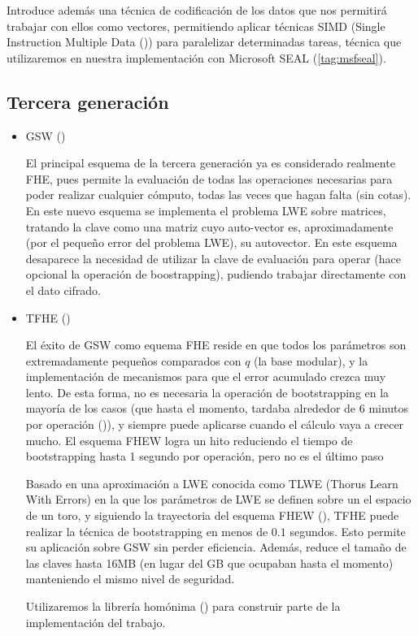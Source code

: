 \begin{itemize}
    Introduce además una técnica de codificación de los datos que nos permitirá trabajar con ellos como vectores, permitiendo aplicar técnicas SIMD (Single Instruction Multiple Data (\cite{wikipedia_contributors._simd_2017})) para paralelizar determinadas tareas, técnica que utilizaremos en nuestra implementación con Microsoft SEAL (\ref{tag:msfseal}).

\end{itemize}

\subsection{Tercera generación}

\begin{itemize}

  \item GSW (\cite{gentry_homomorphic_2013})

  El principal esquema de la tercera generación ya es considerado realmente FHE, pues permite la evaluación de todas las operaciones necesarias para poder realizar cualquier cómputo, todas las veces que hagan falta (sin cotas). En este nuevo esquema se implementa el problema LWE sobre matrices, tratando la clave como una matriz cuyo auto-vector es, aproximadamente (por el pequeño error del problema LWE), su autovector. En este esquema desaparece la necesidad de utilizar la clave de evaluación para operar (hace opcional la operación de boostrapping), pudiendo trabajar directamente con el dato cifrado.

  \item TFHE (\cite{cheon_faster_2016})

  El éxito de GSW como equema FHE reside en que todos los parámetros son extremadamente pequeños comparados con $q$ (la base modular), y la implementación de mecanismos para que el error acumulado crezca muy lento. De esta forma, no es necesaria la operación de bootstrapping en la mayoría de los casos (que hasta el momento, tardaba alrededor de 6 minutos por operación (\cite{ducas_fhew:_2014})), y siempre puede aplicarse cuando el cálculo vaya a crecer mucho. El esquema FHEW logra un hito reduciendo el tiempo de bootstrapping hasta 1 segundo por operación, pero no es el último paso

  Basado en una aproximación a LWE conocida como TLWE (Thorus Learn With Errors) en la que los parámetros de LWE se definen sobre un el espacio de un toro, y siguiendo la trayectoria del esquema FHEW (\cite{ducas_fhew:_2014}), TFHE puede realizar la técnica de bootstrapping en menos de $0.1$ segundos. Esto permite su aplicación sobre GSW sin perder eficiencia. Además, reduce el tamaño de las claves hasta 16MB (en lugar del GB que ocupaban hasta el momento) manteniendo el mismo nivel de seguridad.

  Utilizaremos la librería homónima (\cite{chillotti_tfhe:_2016}) para construir parte de la implementación del trabajo.

\end{itemize}
